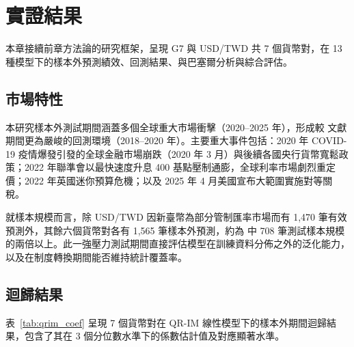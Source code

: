 
\chapter{實證結果}
\label{chap:results}

本章接續前章方法論的研究框架，呈現 G7 與 USD/TWD 共 7 個貨幣對，在 13 種模型下的樣本外預測績效、回測結果、與巴塞爾分析與綜合評估。

\section{市場特性}
\label{sec:oos_overview}

本研究樣本外測試期間涵蓋多個全球重大市場衝擊（2020–2025 年），形成較 \citet{blom2023estimating} 文獻期間更為嚴峻的回測環境（2018–2020 年）。主要重大事件包括：2020 年 COVID-19 疫情爆發引發的全球金融市場崩跌（2020 年 3 月）與後續各國央行貨幣寬鬆政策；2022 年聯準會以最快速度升息 400 基點壓制通膨，全球利率市場劇烈重定價；2022 年英國迷你預算危機；以及 2025 年 4 月美國宣布大範圍實施對等關稅。

就樣本規模而言，除 USD/TWD 因新臺幣為部分管制匯率市場而有 1,470 筆有效預測外，其餘六個貨幣對各有 1,565 筆樣本外預測，約為 \citet{blom2023estimating}中 708 筆測試樣本規模的兩倍以上。此一強壓力測試期間直接評估模型在訓練資料分佈之外的泛化能力，以及在制度轉換期間能否維持統計覆蓋率。


\section{迴歸結果}
\label{sec:qrim_coef}

表~\ref{tab:qrim_coef} 呈現 7 個貨幣對在 QR-IM 線性模型下的樣本外期間迴歸結果，包含了其在 3 個分位數水準下的係數估計值及對應顯著水準。

